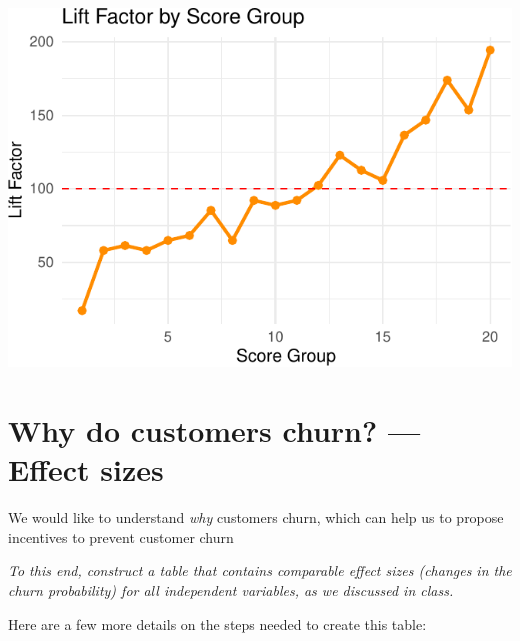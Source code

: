 \documentclass[
]{article}
\begin{document}
\begin{flushright}\includegraphics{p5-6_files/figure-latex/unnamed-chunk-14-2} \end{flushright}

\newpage

\section{Why do customers churn? --- Effect
sizes}\label{why-do-customers-churn-effect-sizes}

We would like to understand \emph{why} customers churn, which can help
us to propose incentives to prevent customer churn

\emph{To this end, construct a table that contains comparable effect
sizes (changes in the churn probability) for all independent variables,
as we discussed in class.}

Here are a few more details on the steps needed to create this table:
\end{document}
